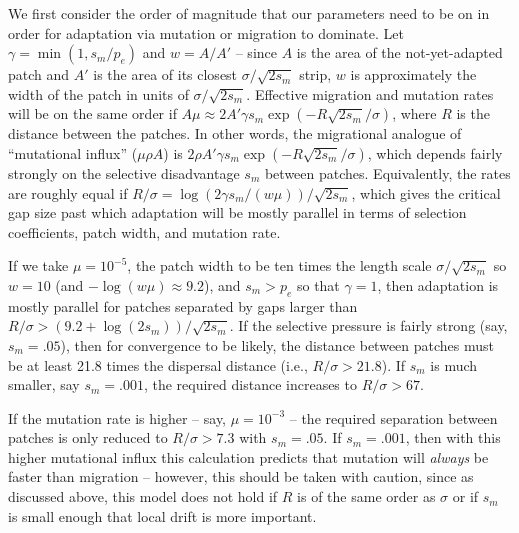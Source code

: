 \documentclass[10pt,letterpaper]{article}
\begin{document}
We first consider the order of magnitude that our parameters need to
be on in order for adaptation via mutation or migration to dominate.
Let $\gamma = \min(1,s_m/p_e)$
and $w = A/A'$ 
-- since $A$ is the area of the not-yet-adapted patch and $A'$ is the area of its closest $\sigma/\sqrt{2s_m}$ strip,
$w$ is approximately the width of the patch in units of $\sigma/\sqrt{2s_m}$.
Effective migration and mutation rates will be on the same order if 
$A \mu \approx 2 A' \gamma s_m \exp(- R \sqrt{2 s_m} / \sigma)$,
where $R$ is the distance between the patches.
In other words, the migrational analogue of ``mutational influx'' ($\mu \rho A$) 
is $2 \rho A' \gamma s_m \exp(- R \sqrt{2 s_m} / \sigma)$,
which depends fairly strongly on the selective disadvantage $s_m$ between patches.
Equivalently, the rates are roughly equal if
$R/\sigma = \log(2 \gamma s_m/(w \mu))/\sqrt{2s_m}$,
which gives the critical gap size past which adaptation will be mostly parallel
in terms of selection coefficients, patch width, and mutation rate.


If we take 
$\mu=10^{-5}$,
the patch width to be ten times the length scale $\sigma/\sqrt{2s_m}$
so $w=10$ (and $-\log(w\mu)\approx 9.2$),
and $s_m>p_e$ so that $\gamma=1$,
then adaptation is mostly parallel for patches separated by gaps larger than $R/\sigma > (9.2+\log(2s_m))/\sqrt{2s_m}$.
If the selective pressure is fairly strong (say, $s_m=.05$),
then for convergence to be likely,
the distance between patches must be at least 21.8 times the dispersal distance (i.e., $R/\sigma > 21.8$).
If $s_m$ is much smaller, say $s_m = .001$, 
the required distance increases to $R/\sigma > 67$.

If the mutation rate is higher -- say, $\mu=10^{-3}$ --
the required separation between patches is only reduced to $R/\sigma > 7.3$ with $s_m=.05$.
If $s_m=.001$, then with this higher mutational influx this calculation predicts that mutation will \emph{always} be faster than migration
-- however, this should be taken with caution,
since as discussed above, this model does not hold if $R$ is of the same order as $\sigma$
or if $s_m$ is small enough that local drift is more important.
\end{document}
